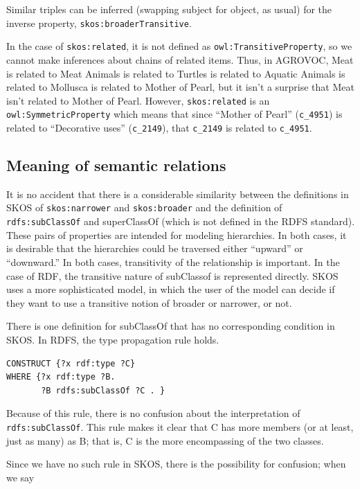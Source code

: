 Similar triples can be inferred (swapping subject for object, as usual)
for the inverse property,
\texttt{skos:broaderTransitive}.

In the case of \texttt{skos:related}, it is not defined as
\texttt{owl:TransitiveProperty}, so we cannot make inferences about chains of
related items. Thus, in AGROVOC, Meat is related to Meat Animals is
related to Turtles is related to Aquatic Animals is related to Mollusca
is related to Mother of Pearl, but it isn't a surprise that Meat isn't
related to Mother of Pearl. However, \texttt{skos:related} is an
\texttt{owl:SymmetricProperty} which means that since ``Mother of Pearl''
(\texttt{c\_4951}) is related to ``Decorative uses'' (\texttt{c\_2149}), that \texttt{c\_2149} is
related to \texttt{c\_4951}.

\subsection{Meaning of semantic relations}
\label{ch11.semrel}
It is no accident that there is a considerable similarity between the
definitions in SKOS of \texttt{skos:narrower} and \texttt{skos:broader} and the definition
of \texttt{rdfs:subClassOf} and superClassOf (which is not defined in the RDFS
standard). These pairs of properties are intended for modeling
hierarchies. In both cases, it is desirable that the hierarchies could
be traversed either ``upward'' or ``downward.'' In both cases,
transitivity of the relationship is important. In the case of RDF, the
transitive nature of subClassof is represented directly. SKOS uses a
more sophisticated model, in which the user of the model can decide if
they want to use a transitive notion of broader or narrower, or not.

There is one definition for subClassOf that has no corresponding
condition in SKOS. In RDFS, the type propagation rule holds.

\begin{lstlisting}
CONSTRUCT {?x rdf:type ?C}
WHERE {?x rdf:type ?B.
       ?B rdfs:subClassOf ?C . }
\end{lstlisting}

Because of this rule, there is no confusion about the interpretation of
\texttt{rdfs:subClassOf}. This rule makes it clear that C has more members (or at
least, just as many) as B; that is, C is the more encompassing of the
two classes.

Since we have no such rule in SKOS, there is the possibility for
confusion; when we say


